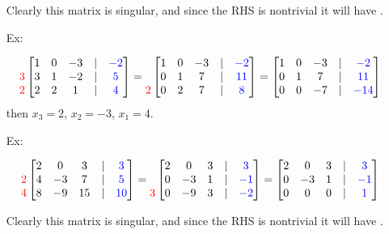 \documentclass[reqno]{amsart}
\theoremstyle{definition}
\begin{document}
\begin{enumerate}
Clearly this matrix is singular, and since the RHS is nontrivial it will have .

\item[Ex:   ]  

\begin{equation*}
\begin{matrix}
\\
{\color{red}3}\\
{\color{red}2}
\end{matrix}
\begin{bmatrix}
1 & 0 & -3 & | & {\color{blue}-2}\\
3 & 1 & -2 & | & {\color{blue}5}\\
2 & 2 & 1 & | & {\color{blue}4}
\end{bmatrix} = \begin{matrix}
\\
\\
{\color{red}2}
\end{matrix}\begin{bmatrix}
1 & 0 & -3 & | & {\color{blue}-2}\\
0 & 1 & 7 & | & {\color{blue}11}\\
0 & 2 & 7 & | & {\color{blue}8}
\end{bmatrix} = \begin{bmatrix}
1 & 0 & -3 & | & {\color{blue}-2}\\
0 & 1 & 7 & | & {\color{blue}11}\\
0 & 0 & -7 & | & {\color{blue}-14}
\end{bmatrix}
\end{equation*}
%
then $x_3 = 2$, $x_2 = -3$, $x_1 = 4$.

\item[Ex:   ]  

\begin{equation*}
\begin{matrix}
\\
{\color{red}2}\\
{\color{red}4}
\end{matrix}
\begin{bmatrix}
2 & 0 & 3 & | & {\color{blue}3}\\
4 & -3 & 7 & | & {\color{blue}5}\\
8 & -9 & 15 & | & {\color{blue}10}
\end{bmatrix} = \begin{matrix}
\\
\\
{\color{red}3}
\end{matrix}\begin{bmatrix}
2 & 0 & 3 & | & {\color{blue}3}\\
0 & -3 & 1 & | &  {\color{blue}-1}\\
0 & -9 & 3 & | &  {\color{blue}-2}
\end{bmatrix} = \begin{bmatrix}
2 & 0 & 3 & | & {\color{blue}3}\\
0 & -3 & 1 & | &  {\color{blue}-1}\\
0 & 0 & 0 & | & {\color{blue}1}
\end{bmatrix}
\end{equation*}

Clearly this matrix is singular, and since the RHS is nontrivial it will have .

\end{enumerate}
\end{document}
